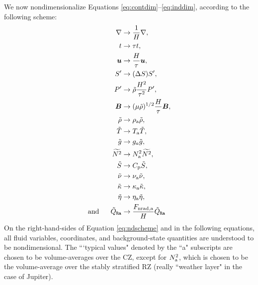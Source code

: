\documentclass[12pt]{article}
\numberwithin{equation}{section}
\newcommand{\tmpa}{T_{\rm a}}
\newcommand{\rhoa}{\rho_{\rm a}}
\newcommand{\nsqa}{N^2_{\rm a}}
\newcommand{\nua}{\nu_{\rm a}}
\newcommand{\kappaa}{\kappa_{\rm a}}
\newcommand{\etaa}{\eta_{\rm a}}
\newcommand{\fnrada}{F_{\rm{nrad,a}}}
\begin{document}
	We now nondimensionalize Equations \eqref{eq:contdim}--\eqref{eq:inddim}, according to the following scheme:
	\begin{subequations}\label{eq:ndscheme}
	\begin{align}
		\nabla &\rightarrow \frac{1}{H}\nabla,\\
		t &\rightarrow \tau t,\\
		\vecu &\rightarrow \frac{H}{\tau} \vecu,\\
		\entrprime &\rightarrow (\Delta S) \entrprime,\\
		\prsprime &\rightarrow \tilde{\rho} \frac{H^2}{\tau^2} \prsprime,\\
		\vecb &\rightarrow (\mu\tilde{\rho})^{1/2}\frac{H}{\tau} \vecb,\\ 
		\rhotilde &\rightarrow \rhoa \rhotilde, \\
		\tmptilde &\rightarrow \tmpa \tmptilde,\\
		\gtilde &\rightarrow g_a \gtilde,\\
		\nsqtilde &\rightarrow \nsqa \nsqtilde,\\
		\entrtilde &\rightarrow \cpcap \entrtilde,\\
		\nutilde &\rightarrow \nua\nutilde,\\
		\kappatilde &\rightarrow\kappaa\kappatilde,\\
		 \etatilde &\rightarrow \etaa\etatilde,\\ 
		\andd \heatra &\rightarrow \frac{\fnrada}{H} \heatra
	\end{align}
	\end{subequations}
	On the right-hand-sides of Equation \eqref{eq:ndscheme} and in the following equations, all fluid variables, coordinates, and background-state quantities are understood to be nondimensional. The ```typical values" denoted by the ``a" subscripts are chosen to be volume-averages over the CZ, except for $\nsqa$, which is chosen to be the volume-average over the stably stratified RZ (really ``weather layer" in the case of Jupiter). 
	
\end{document}
